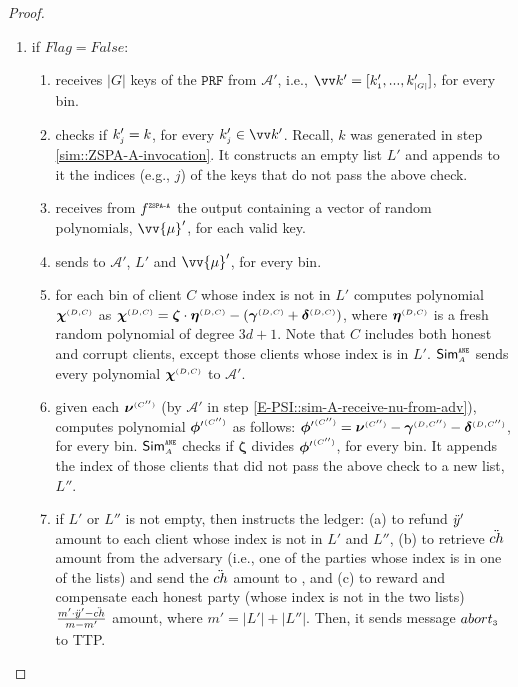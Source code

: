 \begin{proof}
\begin{enumerate}
\begin{enumerate}
\item if $Flag=False$: 
\begin{enumerate}
%
 \item receives $|G|$ keys of the $\mathtt{PRF}$ from $\mathcal{A}'$, i.e., $\vv k'=[  k'_{\st 1}, ...,  k'_{\st |G|}]$, for every bin. %
\item checks if $ k'_{\scriptscriptstyle j}= k$, for every $ k'_{\st j}\in\vv k'$. Recall,  $ k$ was generated in step \ref{sim::ZSPA-A-invocation}. It constructs an empty list $ L'$ and appends to it the indices (e.g., $j$) of the keys that do not pass the above check. 
 \item receives from $f^{\scriptscriptstyle \mathtt{ZSPA\text{-}A}}$ the output containing a vector of random polynomials, $\vv{\mu}'$, for each valid key. 
 \item sends to  $\mathcal{A}'$, $ L'$ and $\vv{\mu}'$, for every bin. 
 \item  for each bin of client $  {  C}$ whose index is not in $ L'$ computes polynomial ${\bm\chi}^{ \scriptscriptstyle {  {(D, C)}}}$ as
 ${\bm\chi}^{ \scriptscriptstyle {  {(D, C)}}}={\bm\zeta}\cdot {\bm\eta}^{ \scriptscriptstyle {  {(D,C)}}}-({\bm\gamma}^{ \scriptscriptstyle {  {(D,C)}}}+{\bm\delta}^{ \scriptscriptstyle {  {(D,C)}}})$,   where ${\bm\eta}^{ \scriptscriptstyle {  {(D,C)}}}$ is a fresh random polynomial of degree $3d+1$. Note that  $C$ includes both honest and corrupt clients, except those clients whose index is in  $ L'$. $\mathsf{Sim}^{\scriptscriptstyle \mathtt{ANE}}_{\scriptscriptstyle A}$ sends every polynomial ${\bm\chi}^{ \scriptscriptstyle {  {(D, C)}}}$ to  $\mathcal{A}'$. 
 \item\label{sim::case1-check-final-res-for-each-client} given each ${\bm\nu}^{ \scriptscriptstyle {  {(C'')}} }$ (by $\mathcal{A}'$ in step \ref{E-PSI::sim-A-receive-nu-from-adv}), computes polynomial $ {\bm\phi'}^{ \scriptscriptstyle {  {(C'')}} }$ as follows: ${\bm\phi'}^{ \scriptscriptstyle {  {(C'')}} } = {\bm\nu}^{ \scriptscriptstyle {  {(C'')}} }- {\bm\gamma}^{ \scriptscriptstyle {  {(D,C'')}}} - {\bm\delta}^{ \scriptscriptstyle {  {(D,C'')}}}$, for every bin.  $\mathsf{Sim}^{\scriptscriptstyle \mathtt{ANE}}_{\scriptscriptstyle A}$ checks if  ${\bm\zeta}$  divides $ {\bm\phi'}^{ \scriptscriptstyle {  {(C'')}} }$, for every bin. It appends the index of those clients that did not pass the above check to a new list, $ L''$. 
 \item if  $ L'$ or $ L''$ is not empty, then instructs the ledger: (a) to refund $\ddot{y}'$ amount to each  client whose index is not in $ L'$ and $ L''$, (b) to retrieve $\ddot{ch}$ amount from the adversary (i.e., one of the parties whose index is in one of the lists) and send the $\ddot{ch}$ amount to \aud, and (c) to reward and compensate each honest party (whose index is not in the two lists)  $\frac{m'\cdot \ddot{y}'-\ddot{ch}}{m-m'}$ amount, where $m'=| L'|+| L''|$.  Then, it sends message $abort_{\scriptscriptstyle 3}$ to TTP. 

\end{enumerate}
\end{enumerate}
\end{enumerate}
\end{proof}
